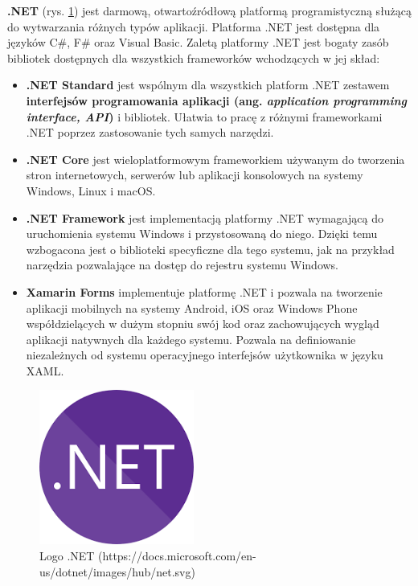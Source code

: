 \textbf{.NET} (rys. \ref{dotnet_logo}) jest darmową, otwartoźródłową platformą programistyczną służącą do wytwarzania różnych typów aplikacji. Platforma .NET jest dostępna dla języków C\#, F\# oraz Visual Basic. Zaletą platformy .NET jest bogaty zasób bibliotek dostępnych dla wszystkich frameworków wchodzących w jej skład:
\begin{itemize}
	\item\textbf{.NET Standard} jest wspólnym dla wszystkich platform .NET zestawem \textbf{interfejsów programowania aplikacji (ang. \textit{application programming interface, API})} i bibliotek. Ułatwia to pracę z różnymi frameworkami .NET poprzez zastosowanie tych samych narzędzi.
	\item\textbf{.NET Core} jest wieloplatformowym frameworkiem używanym do tworzenia stron internetowych, serwerów lub aplikacji konsolowych na systemy Windows, Linux i macOS.
	\item\textbf{.NET Framework} jest implementacją platformy .NET wymagającą do uruchomienia systemu Windows i przystosowaną do niego. Dzięki temu wzbogacona jest o biblioteki specyficzne dla tego systemu, jak na przykład narzędzia pozwalające na dostęp do rejestru systemu Windows.
	\item\textbf{Xamarin Forms} implementuje platformę .NET i pozwala na tworzenie aplikacji mobilnych na systemy Android, iOS oraz Windows Phone współdzielących w dużym stopniu swój kod oraz zachowujących wygląd aplikacji natywnych dla każdego systemu.\cite{microsoftdotnet} Pozwala na definiowanie niezależnych od systemu operacyjnego interfejsów użytkownika w języku XAML.
\end{itemize}
\begin{figure}[!ht]
\begin{center}
	\includegraphics[width=2in]{img/logo/dotnet.png}
	\caption{Logo .NET (https://docs.microsoft.com/en-us/dotnet/images/hub/net.svg)}
	\label{dotnet_logo}
\end{center}
\end{figure}

